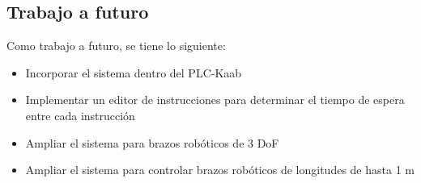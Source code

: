 \subsection{Trabajo a futuro}

Como trabajo a futuro, se tiene lo siguiente:

\begin{itemize}
	\item Incorporar el sistema dentro del PLC-Kaab
	\item Implementar un editor de instrucciones para determinar el tiempo de espera entre cada instrucción
	\item Ampliar el sistema para brazos robóticos de 3 DoF
	\item Ampliar el sistema para controlar brazos robóticos de longitudes de hasta 1 m
\end{itemize}
